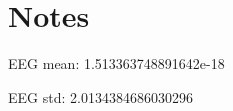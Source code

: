 \documentclass[a4paper, UKenglish, 11pt]{uiomaster}
\begin{document}
\chapter{Notes}

EEG mean: 1.513363748891642e-18

EEG std: 2.0134384686030296
\end{document}
